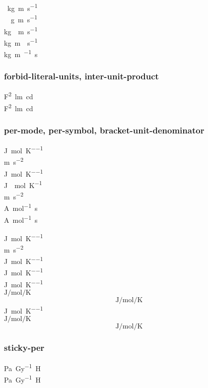 \documentclass{article}
\begin{document}
\si{\cancel\kilo\gram\metre\per\second} \\
\si{\kilo\cancel\gram\metre\per\second} \\
\si{\kilo\gram\cancel\metre\per\second} \\
\si{\kilo\gram\metre\cancel\per\second} \\
\si{\kilo\gram\metre\per\cancel\second} \\

\subsubsection{forbid-literal-units, inter-unit-product}
\si{\farad\squared\lumen\candela} \\
\si[inter-unit-product = \ensuremath{{}\cdot{}}]
{\farad\squared\lumen\candela}\\

\subsubsection{per-mode, per-symbol, bracket-unit-denominator}
\si{\joule\per\mole\per\kelvin} \\
\si{\metre\per\second\squared} \\
\si[per-mode=fraction]{\joule\per\mole\per\kelvin} \\
\si[per-mode=fraction]{\joule{}\mole\per\kelvin} \\
\si[per-mode=fraction]{\metre\per\second\squared}\\
\si{\ampere\per\mole\second} \\
\si[per-mode = reciprocal-positive-first]{\ampere\per\mole\second}

{
%
\si{\joule\per\mole\per\kelvin} \\
\si{\metre\per\second\squared} \\
\si[per-symbol = \text{~div~}]{\joule\per\mole\per\kelvin} \\
\si[bracket-unit-denominator = false]{\joule\per\mole\per\kelvin}\\
}
\si[per-mode=repeated-symbol]{\joule\per\mole\per\kelvin}\\
{
%
\( \si{\joule\per\mole\per\kelvin} \)
\[ \si{\joule\per\mole\per\kelvin} \]
\si{\joule\per\mole\per\kelvin} \\
\(
\displaystyle
\si{\joule\per\mole\per\kelvin}
\)
\[
\textstyle
\si{\joule\per\mole\per\kelvin}
\]
}

\subsubsection{sticky-per}
\si{\pascal\per\gray\henry} \\
\si[sticky-per]{\pascal\per\gray\henry}\\
\end{document}

